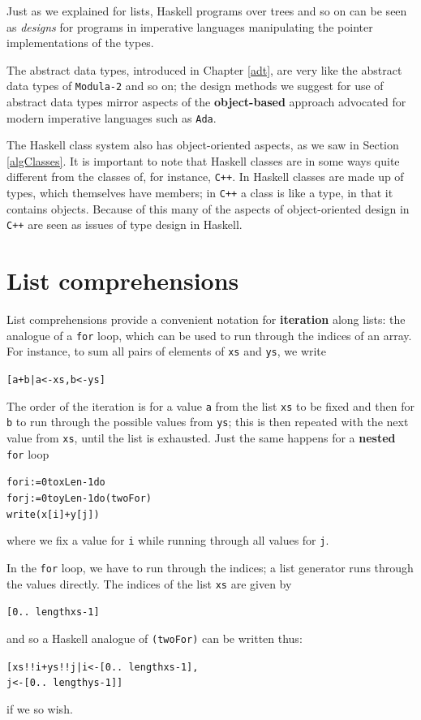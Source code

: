 Just as we explained for lists, Haskell programs over trees and so on can be
seen as {\em designs\/} for programs in imperative languages manipulating the
pointer implementations of the types.

The abstract data types,
introduced in Chapter \ref{adt}, are very like the abstract
data types of \texttt{Modula-2} and so on; the design  methods we suggest for
use of abstract data types mirror
aspects of the \textbf{object-based} approach advocated for
modern imperative languages such as \texttt{Ada}. 

The Haskell class system also has object-oriented aspects, as we saw in
Section \ref{algClasses}. It is important to note that Haskell classes are in
some ways quite different from the classes of, for instance, \texttt{C++}. In
Haskell classes are made up of types, which themselves have members; in 
\texttt{C++} a class is like a type, in that it contains objects. Because of this many
of the aspects of object-oriented design in \texttt{C++} are seen as issues of
type design in Haskell.
\vspace{-3pt}

\section*{List comprehensions}
\vspace{-3pt}

List comprehensions provide a convenient notation for \textbf{iteration\/} along
lists: the analogue of a \texttt{for} loop, which can be used to run through the
indices of an array. For instance, to sum all pairs of elements of \texttt{xs} and
\texttt{ys}, we write
\begin{alltt}
[ a+b | a <- xs , b <- ys ]
\end{alltt}
The order of the iteration is for a value \texttt{a} from the list \texttt{xs} to be
fixed and then for \texttt{b} to run through the possible values from \texttt{ys};
this is then repeated with the next value from \texttt{xs}, until the list is
exhausted. Just the same happens for a \textbf{nested\/} \texttt{for} loop
\begin{alltt}
for i:=0 to xLen-1 do
  for j:=0 to yLen-1 do\hfill (twoFor)
    write( x[i]+y[j] ) 
\end{alltt}
where we fix a value for \texttt{i} while running through all values for 
\texttt{j}.

In the \texttt{for} loop, we have to run through the indices; a list generator
runs through the values directly. The indices of the list
\texttt{xs} are given by 
\begin{alltt}
[0 ..\ length xs - 1]
\end{alltt}
and so a Haskell analogue of 
\texttt{(twoFor)} can be written thus:
\begin{alltt}
[ xs!!i + ys!!j | i <- [0 ..\ length xs - 1] , 
                  j <- [0 ..\ length ys - 1] ]
\end{alltt}
if we so wish. 
\vspace{-3pt}

